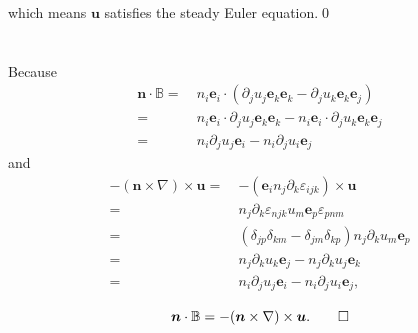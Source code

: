 \documentclass[12pt]{article}
\begin{document}
which means $\bm{u}$ satisfies the steady Euler equation.\qed

\subsection{}



\section{}

Because
\begin{equation}
	\begin{split}
		\bm{n} \cdot \mathbb{B} =\  & n_i \bm{e}_i \cdot (\partial_j u_j \bm{e}_k \bm{e}_k -  \partial_j u_k \bm{e}_k \bm{e}_j) \\
		=\  & n_i \bm{e}_i \cdot \partial_j u_j \bm{e}_k \bm{e}_k - n_i \bm{e}_i \cdot \partial_j u_k \bm{e}_k \bm{e}_j\\
		=\  & n_i \partial_j u_j \bm{e}_i - n_i \partial_j u_i \bm{e}_j
	\end{split}
\end{equation}
and
\begin{equation}
	\begin{split}
		-(\boldsymbol{n} \times \nabla) \times \boldsymbol{u} =\  & - (\bm{e}_i n_j \partial_k \varepsilon_{ijk}) \times \bm{u}\\
		=\  & n_j \partial_k \varepsilon_{njk} u_m \bm{e}_p \varepsilon_{pnm}\\
		=\  & (\delta_{jp}\delta_{km}-\delta_{jm}\delta_{kp}) n_j \partial_k u_m \bm{e}_p\\
		=\  & n_j \partial_k u_k \bm{e}_j - n_j \partial_k u_j \bm{e}_k\\
		=\  & n_i \partial_j u_j \bm{e}_i - n_i \partial_j u_i \bm{e}_j,
	\end{split}
\end{equation}

\begin{equation}
	\boldsymbol{n} \cdot \mathbb{B}=-(\boldsymbol{n} \times \nabla) \times \boldsymbol{u}.\qed
\end{equation}

\section{}
\end{document}
